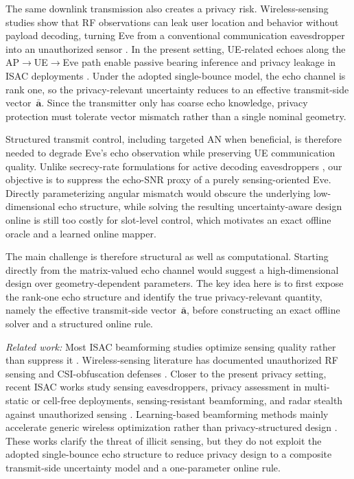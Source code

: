 \documentclass[journal]{IEEEtran}
\begin{document}
The same downlink transmission also creates a privacy risk. Wireless-sensing studies show that RF observations can leak user location and behavior without payload decoding, turning Eve from a conventional communication eavesdropper into an unauthorized sensor \cite{zhu2018adversarial}. In the present setting, UE-related echoes along the AP$\rightarrow$UE$\rightarrow$Eve path enable passive bearing inference and privacy leakage in ISAC deployments \cite{zhou2022aoa,da2023multi,ren2024secure}. Under the adopted single-bounce model, the echo channel is rank one, so the privacy-relevant uncertainty reduces to an effective transmit-side vector~$\bar{\mathbf{a}}$. Since the transmitter only has coarse echo knowledge, privacy protection must tolerate vector mismatch rather than a single nominal geometry.

Structured transmit control, including targeted AN when beneficial, is therefore needed to degrade Eve's echo observation while preserving UE communication quality. Unlike secrecy-rate formulations for active decoding eavesdroppers \cite{khisti2010secure,goel2008guaranteeing}, our objective is to suppress the echo-SNR proxy of a purely sensing-oriented Eve. Directly parameterizing angular mismatch would obscure the underlying low-dimensional echo structure, while solving the resulting uncertainty-aware design online is still too costly for slot-level control, which motivates an exact offline oracle and a learned online mapper.

The main challenge is therefore structural as well as computational. Starting directly from the matrix-valued echo channel would suggest a high-dimensional design over geometry-dependent parameters. The key idea here is to first expose the rank-one echo structure and identify the true privacy-relevant quantity, namely the effective transmit-side vector~$\bar{\mathbf{a}}$, before constructing an exact offline solver and a structured online rule.

\textit{Related work:} Most ISAC beamforming studies optimize sensing quality rather than suppress it \cite{liu2021cramer,song2023intelligent,xing2023joint}. Wireless-sensing literature has documented unauthorized RF sensing and CSI-obfuscation defenses \cite{zhu2018adversarial,cominelli2022antisense}. Closer to the present privacy setting, recent ISAC works study sensing eavesdroppers, privacy assessment in multi-static or cell-free deployments, sensing-resistant beamforming, and radar stealth against unauthorized sensing \cite{da2023multi,ren2024secure,ma2024sensing,xu2025intelligent,zheng2024intelligent}. Learning-based beamforming methods mainly accelerate generic wireless optimization rather than privacy-structured design \cite{balatsoukas2019deep,hu2020iterative,chen2023graph,wang2024heterogeneous}. These works clarify the threat of illicit sensing, but they do not exploit the adopted single-bounce echo structure to reduce privacy design to a composite transmit-side uncertainty model and a one-parameter online rule.
\end{document}
